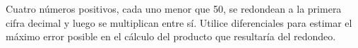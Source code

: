 \item Cuatro números positivos, cada uno menor que 50, se redondean a la primera cifra decimal y luego se multiplican entre sí. Utilice diferenciales para estimar el máximo error posible en el cálculo del producto que resultaría del redondeo.
